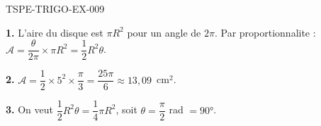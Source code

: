 \begin{corrige}{TSPE-TRIGO-EX-009}

\textbf{1.} L'aire du disque est $\pi R^2$ pour un angle de $2\pi$. Par proportionnalite :
$\mathcal{A} = \dfrac{\theta}{2\pi} \times \pi R^2 = \dfrac{1}{2}R^2\theta$.

\textbf{2.} $\mathcal{A} = \dfrac{1}{2} \times 5^2 \times \dfrac{\pi}{3} = \dfrac{25\pi}{6} \approx 13{,}09$~cm$^2$.

\textbf{3.} On veut $\dfrac{1}{2}R^2\theta = \dfrac{1}{4}\pi R^2$, soit $\theta = \dfrac{\pi}{2}$ rad $= 90°$.

\end{corrige}
